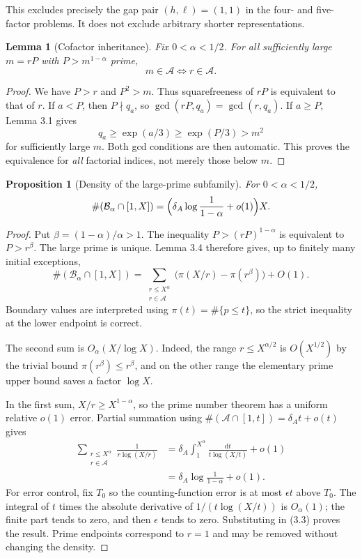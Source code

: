 \documentclass[letterpaper]{article}
\newtheorem{lemma}[theorem]{Lemma}
\newtheorem{proposition}[theorem]{Proposition}
\theoremstyle{definition}
\theoremstyle{remark}
\numberwithin{equation}{section}
\begin{document}
This excludes precisely the gap pair $(h,\ell)=(1,1)$ in the four- and five-factor problems. It
does not exclude arbitrary shorter representations.

\begin{lemma}[Cofactor inheritance]
Fix $0<\alpha<1/2$. For all sufficiently large $m=rP$ with
$P>m^{1-\alpha}$ prime,
\[
  m\in\mathcal A\iff r\in\mathcal A.
\]
\end{lemma}

\begin{proof}
We have $P>r$ and $P^2>m$. Thus squarefreeness of $rP$ is equivalent to that of $r$. If
$a<P$, then $P\nmid q_a$, so $\gcd(rP,q_a)=\gcd(r,q_a)$. If $a\ge P$, Lemma 3.1 gives
\[
  q_a\ge\exp(a/3)\ge\exp(P/3)>m^2
\]
for sufficiently large $m$. Both gcd conditions are then automatic. This proves the equivalence
for \emph{all} factorial indices, not merely those below $m$.
\end{proof}

\begin{proposition}[Density of the large-prime subfamily]
For $0<\alpha<1/2$,
\begin{equation}
  \#(\mathcal B_\alpha\cap[1,X])=\Bigl(\delta_A\log\frac{1}{1-\alpha}+o(1)\Bigr)X.
\end{equation}
\end{proposition}

\begin{proof}
Put $\beta=(1-\alpha)/\alpha>1$. The inequality $P>(rP)^{1-\alpha}$ is equivalent to $P>r^\beta$. The large
prime is unique. Lemma 3.4 therefore gives, up to finitely many initial exceptions,
\begin{equation}
  \#(\mathcal B_\alpha\cap[1,X])=\sum_{\substack{r\le X^\alpha\\ r\in\mathcal A}}\bigl(\pi(X/r)-\pi(r^\beta)\bigr)+O(1).
\end{equation}
Boundary values are interpreted using $\pi(t)=\#\{p\le t\}$, so the strict inequality at the lower
endpoint is correct.

The second sum is $O_\alpha(X/\log X)$. Indeed, the range $r\le X^{\alpha/2}$ is $O(X^{1/2})$ by the trivial
bound $\pi(r^\beta)\le r^\beta$, and on the other range the elementary prime upper bound saves a factor
$\log X$.

In the first sum, $X/r\ge X^{1-\alpha}$, so the prime number theorem has a uniform relative $o(1)$
error. Partial summation using $\#(\mathcal A\cap[1,t])=\delta_At+o(t)$ gives
\begin{align*}
  \sum_{\substack{r\le X^\alpha\\ r\in\mathcal A}}\frac{1}{r\log(X/r)}
  &=\delta_A\int_1^{X^\alpha}\frac{\mathrm dt}{t\log(X/t)}+o(1)\\
  &=\delta_A\log\frac{1}{1-\alpha}+o(1).
\end{align*}
For error control, fix $T_0$ so the counting-function error is at most $\epsilon t$ above $T_0$. The integral of $t$
times the absolute derivative of $1/(t\log(X/t))$ is $O_\alpha(1)$; the finite part tends to zero, and then $\epsilon$
tends to zero. Substituting in (3.3) proves the result. Prime endpoints correspond to $r=1$ and
may be removed without changing the density.
\end{proof}
\end{document}
